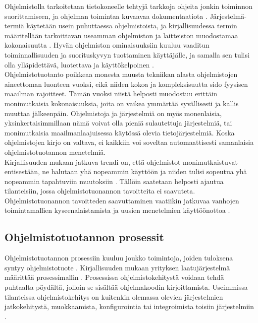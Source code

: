 \documentclass[finnish,12pt,a4paper,pdftex]{article}
\begin{document}
Ohjelmistolla tarkoitetaan tietokoneelle tehtyjä tarkkoja ohjeita jonkin toiminnon suorittamiseen, ja ohjelman toimintaa kuvaavaa dokumentaatiota \citep{sommerville}. Järjestelmä-termiä käytetään usein puhuttaessa ohjelmistoista, ja kirjallisuudessa termin määritellään tarkoittavan useamman ohjelmiston ja laitteiston muodostamaa kokonaisuutta \citep{okaytannot}. Hyvän ohjelmiston ominaisuuksiin kuuluu vaaditun toiminnallisuuden ja suorituskyvyn tuottaminen käyttäjälle, ja samalla sen tulisi olla ylläpidettävä, luotettava ja käyttökelpoinen \citep{sommerville}.\\

Ohjelmistotuotanto poikkeaa monesta muusta tekniikan alasta ohjelmistojen aineettoman luonteen vuoksi, eikä niiden kokoa ja kompleksisuutta sido fyysisen maailman rajoitteet. Tämän vuoksi niistä helposti muodostuu erittäin monimutkaisia kokonaisuuksia, joita on vaikea ymmärtää syvällisesti ja kallis muuttaa jälkeenpäin. Ohjelmistoja ja järjestelmiä on myös monenlaisia, yksinkertaisimmillaan nämä voivat olla pieniä sulautettuja järjestelmiä, tai monimutkaisia maailmanlaajuisessa käytössä olevia tietojärjestelmiä. Koska ohjelmistojen kirjo on valtava, ei kaikkiin voi soveltaa automaattisesti samanlaisia ohjelmistotuotannon menetelmiä. \citep{sommerville}\\

Kirjallisuuden mukaan jatkuva trendi on, että ohjelmistot monimutkaistuvat entisestään, ne halutaan yhä nopeammin käyttöön ja niiden tulisi sopeutua yhä nopeammin tapahtuviin muutoksiin \citep{sommerville}. Tällöin saatetaan helposti ajautua tilanteisiin, jossa ohjelmistotuonannon tavoitteita ei saavuteta. Ohjelmistotuonannon tavoitteden saavuttaminen vaatiikin jatkuvaa vanhojen toimintamallien kyseenalaistamista ja uusien menetelmien käyttöönottoa \citep{okaytannot}. \\

\subsection{Ohjelmistotuotannon prosessit}

Ohjelmistotuotannon prosessiin kuuluu joukko toimintoja, joiden tuloksena syntyy ohjelmistotuote \citep{sommerville}. Kirjallisuuden mukaan yrityksen laatujärjestelmä määrittää prosessimallin \citep{okaytannot}. Prosessissa ohjelmistokehitystä voidaan tehdä puhtaalta pöydältä, jolloin se sisältää ohjelmakoodin kirjoittamista. Useimmissa tilanteissa ohjelmistokehitys on kuitenkin olemassa olevien järjestelmien jatkokehitystä, muokkaamista, konfigurointia tai integroimista toisiin järjestelmiin \citep{sommerville}. \\
\end{document}
